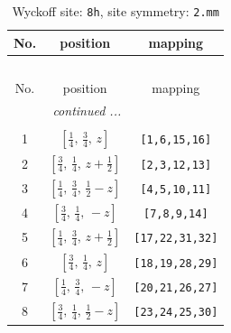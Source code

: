 \documentclass[fleqn,8pt]{jsarticle}
\begin{document}
\begin{longtable}{ccc}
\caption{Wyckoff site: {\tt 8h}, site symmetry: {\tt 2.mm}}
 \\
 \hline \hline
No. & position & mapping \\ \hline \endfirsthead

\multicolumn{2}{l}{\tablename\ \thetable{}} \\
 \hline \hline
No. & position & mapping \\ \hline \endhead

 \hline \hline
\multicolumn{2}{r}{\footnotesize\it continued ...} \\ \endfoot

 \hline \hline
\multicolumn{2}{r}{} \\ \endlastfoot

1 & $\left[ \frac{1}{4},\, \frac{3}{4},\, z \right]$ & {\tt [1,6,15,16]} \\ \hline
2 & $\left[ \frac{3}{4},\, \frac{1}{4},\, z + \frac{1}{2} \right]$ & {\tt [2,3,12,13]} \\ \hline
3 & $\left[ \frac{1}{4},\, \frac{3}{4},\, \frac{1}{2} - z \right]$ & {\tt [4,5,10,11]} \\ \hline
4 & $\left[ \frac{3}{4},\, \frac{1}{4},\, - z \right]$ & {\tt [7,8,9,14]} \\ \hline
5 & $\left[ \frac{1}{4},\, \frac{3}{4},\, z + \frac{1}{2} \right]$ & {\tt [17,22,31,32]} \\ \hline
6 & $\left[ \frac{3}{4},\, \frac{1}{4},\, z \right]$ & {\tt [18,19,28,29]} \\ \hline
7 & $\left[ \frac{1}{4},\, \frac{3}{4},\, - z \right]$ & {\tt [20,21,26,27]} \\ \hline
8 & $\left[ \frac{3}{4},\, \frac{1}{4},\, \frac{1}{2} - z \right]$ & {\tt [23,24,25,30]} \\
\end{longtable}
\renewcommand{\arraystretch}{1.2}
\end{document}
